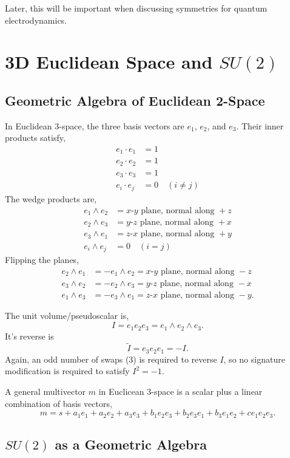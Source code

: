 	Later, this will be important when discussing symmetries for quantum electrodynamics.
	
	\section{3D Euclidean Space and $SU\left( 2\right) $}
	\subsection{Geometric Algebra of Euclidean 2-Space}
	In Euclidean 3-space, the three basis vectors are $e_1$, $e_2$, and $e_3$. Their inner products satisfy,	
	\begin{align*}
		e_1 \cdot e_1 & = 1\\
		e_2 \cdot e_2 & = 1\\
		e_3 \cdot e_3 & = 1\\		
		e_i \cdot e_j & = 0 \quad \left(i\neq j\right)
	\end{align*}	
	The wedge products are,	
	\begin{align*}		
		e_1 \wedge e_2 & = x\text{-}y\text{ plane, normal along }+z\\
		e_2 \wedge e_3 & = y\text{-}z\text{ plane, normal along }+x\\
		e_3 \wedge e_1 & = z\text{-}x\text{ plane, normal along }+y\\
		e_i \wedge e_j & = 0 \quad \left(i=j\right)
	\end{align*}
	Flipping the planes,
	\begin{align*}		
	e_2 \wedge e_1 & = -e_1 \wedge e_2 = x\text{-}y\text{ plane, normal along }-z\\
	e_3 \wedge e_2 & = -e_2 \wedge e_3 = y\text{-}z\text{ plane, normal along }-x\\
	e_1 \wedge e_3 & = -e_3 \wedge e_1 = z\text{-}x\text{ plane, normal along }-y.
	\end{align*}
	
	The unit volume/pseudoscalar is,
	\[
	I = e_1e_2e_3 = e_1 \wedge e_2 \wedge e_3.  
	\]
	It's reverse is
	\[
	\tilde{I} = e_3e_2e_1 = -I.
	\]
	Again, an odd number of swaps (3) is required to reverse $I$, so no signature modification is required to satisfy $I^2=-1.$
	
	A general multivector $m$ in Euclicean 3-space is a scalar plus a linear combination of basis vectors,
	\[
	m = s + a_1e_1 + a_2e_2 + a_3e_3 + b_1e_2e_3 + b_2e_3e_1 + b_3e_1e_2 + ce_1e_2e_3.
	\] 
	\subsection{$SU\left( 2\right) $ as a Geometric Algebra}
	
